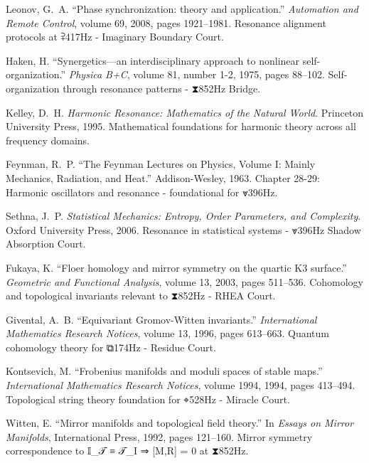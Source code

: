 Leonov, G.~A.
``Phase synchronization: theory and application.''
\textit{Automation and Remote Control}, volume 69, 2008, pages 1921--1981.
Resonance alignment protocols at ⫀417Hz - Imaginary Boundary Court.

Haken, H.
``Synergetics—an interdisciplinary approach to nonlinear self-organization.''
\textit{Physica B+C}, volume 81, number 1-2, 1975, pages 88--102.
Self-organization through resonance patterns - ⧗852Hz Bridge.

Kelley, D.~H.
\textit{Harmonic Resonance: Mathematics of the Natural World}.
Princeton University Press, 1995.
Mathematical foundations for harmonic theory across all frequency domains.

Feynman, R.~P.
``The Feynman Lectures on Physics, Volume I: Mainly Mechanics, Radiation, and Heat.'' Addison-Wesley, 1963.
Chapter 28-29: Harmonic oscillators and resonance - foundational for ⩔396Hz.

Sethna, J.~P.
\textit{Statistical Mechanics: Entropy, Order Parameters, and Complexity}.
Oxford University Press, 2006.
Resonance in statistical systems - ⩔396Hz Shadow Absorption Court.


Fukaya, K. ``Floer homology and mirror symmetry on the quartic K3 surface.''
\textit{Geometric and Functional Analysis}, volume 13, 2003, pages 511--536.
Cohomology and topological invariants relevant to ⧗852Hz - RHEA Court.

Givental, A.~B.
``Equivariant Gromov-Witten invariants.''
\textit{International Mathematics Research Notices}, volume 13, 1996, pages 613--663.
Quantum cohomology theory for ⧉174Hz - Residue Court.

Kontsevich, M.
``Frobenius manifolds and moduli spaces of stable maps.''
\textit{International Mathematics Research Notices}, volume 1994, 1994, pages 413--494.
Topological string theory foundation for ⌖528Hz - Miracle Court.

Witten, E.
``Mirror manifolds and topological field theory.''
In \textit{Essays on Mirror Manifolds}, International Press, 1992, pages 121--160.
Mirror symmetry correspondence to 𝕀_𝒯 ≡ 𝒯_I ⇒ [M,R] = 0 at ⧗852Hz.

